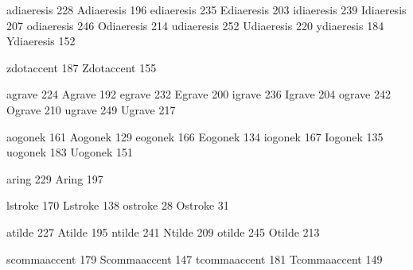  adiaeresis       228
 Adiaeresis       196
 ediaeresis       235
 Ediaeresis       203
 idiaeresis       239
 Idiaeresis       207
 odiaeresis       246
 Odiaeresis       214
 udiaeresis       252
 Udiaeresis       220
 ydiaeresis       184
 Ydiaeresis       152

 zdotaccent       187
 Zdotaccent       155

 agrave           224
 Agrave           192
 egrave           232
 Egrave           200
 igrave           236
 Igrave           204
 ograve           242
 Ograve           210
 ugrave           249
 Ugrave           217

 aogonek          161
 Aogonek          129
 eogonek          166
 Eogonek          134
 iogonek          167
 Iogonek          135
 uogonek          183
 Uogonek          151

 aring            229
 Aring            197

 lstroke          170
 Lstroke          138
 ostroke           28
 Ostroke           31

 atilde           227
 Atilde           195
 ntilde           241
 Ntilde           209
 otilde           245
 Otilde           213

 scommaaccent     179
 Scommaaccent     147
 tcommaaccent     181
 Tcommaaccent     149

\stopencoding

\endinput